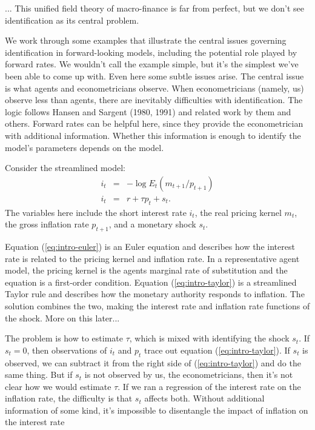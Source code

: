 \documentclass[11pt]{article}
\newcounter{tab}
\begin{document}
{... This unified field theory of macro-finance is far from perfect,
but we don't see identification as its central problem.

We work through some examples that illustrate the central issues
governing identification in forward-looking models,
including the potential role played by forward rates.
We wouldn't call the example simple,
but it's the simplest we've been able to come up with.
Even here some subtle issues arise.
The central issue is what agents and econometricians observe.
When econometricians (namely, us) observe less than agents,
there are inevitably difficulties with identification.
The logic follows Hansen and Sargent (1980, 1991)
and related work by them and others.
Forward rates can be helpful here, since they
provide the econometrician with additional information.
Whether this information is enough to identify the model's parameters
depends on the model.

Consider the streamlined model:
\begin{eqnarray}
    i_t &=& - \log E_t \left( m_{t+1} / p_{t+1} \right)
        \label{eq:intro-euler}  \\
    i_t &=& r + \tau p_t + s_t .
        \label{eq:intro-taylor}
\end{eqnarray}
The variables here include the short interest rate $i_t$,
the real pricing kernel $m_{t}$,
the gross inflation rate $p_{t+1}$,
and a monetary shock $s_t$.

Equation (\ref{eq:intro-euler}) is an Euler equation
and describes how the interest rate is related to the pricing kernel and inflation rate.
In a representative agent model, the pricing kernel is
the agents marginal rate of substitution and the equation is a first-order condition.
Equation (\ref{eq:intro-taylor}) is a streamlined Taylor rule
and describes how the monetary authority responds to inflation.
The solution combines the two, making the interest rate and inflation rate
functions of the shock.
More on this later...

The problem is how to estimate $\tau$, which is mixed with
identifying the shock $s_t$.
If $s_t = 0$, then observations of $i_t$ and $p_t$ trace out equation (\ref{eq:intro-taylor}).
If $s_t$ is observed, we can subtract it from the right side of (\ref{eq:intro-taylor})
and do the same thing.
But if $s_t$ is not observed by us, the econometricians, then it's not clear how
we would estimate $\tau$.
If we ran a regression of the interest rate on the inflation rate, the difficulty
is that $s_t$ affects both.
Without additional information of some kind, it's impossible to disentangle
the impact of inflation on the interest rate


}
\end{document}

